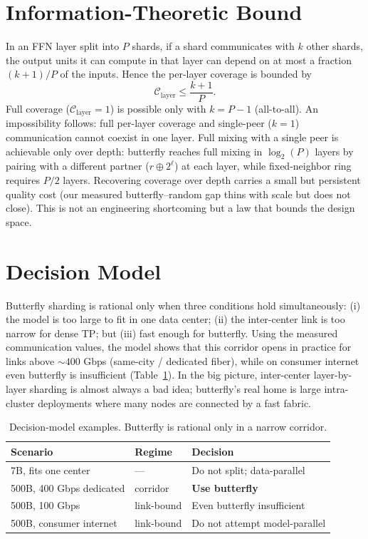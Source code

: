 \documentclass[10pt,journal]{IEEEtran}
\begin{document}
\section{Information-Theoretic Bound}
\label{sec:bound}
In an FFN layer split into $P$ shards, if a shard communicates with $k$ other shards, the output
units it can compute in that layer can depend on at most a fraction $(k{+}1)/P$ of the inputs.
Hence the per-layer coverage is bounded by
\begin{equation}
\mathcal{C}_{\text{layer}} \le \frac{k+1}{P} .
\end{equation}
Full coverage ($\mathcal{C}_{\text{layer}}{=}1$) is possible only with $k{=}P{-}1$ (all-to-all).
An impossibility follows: full per-layer coverage and single-peer ($k{=}1$) communication cannot
coexist in one layer. Full mixing with a single peer is achievable only over depth: butterfly
reaches full mixing in $\log_2(P)$ layers by pairing with a different partner ($r\oplus 2^\ell$)
at each layer, while fixed-neighbor ring requires $P/2$ layers. Recovering coverage over depth
carries a small but persistent quality cost (our measured butterfly--random gap thins with scale
but does not close). This is not an engineering shortcoming but a law that bounds the design space.

\section{Decision Model}
Butterfly sharding is rational only when three conditions hold simultaneously: (i) the model is
too large to fit in one data center; (ii) the inter-center link is too narrow for dense TP; but
(iii) fast enough for butterfly. Using the measured communication values, the model shows that
this corridor opens in practice for links above $\sim\!400$ Gbps (same-city / dedicated fiber),
while on consumer internet even butterfly is insufficient (Table~\ref{tab:decision}). In the big
picture, inter-center layer-by-layer sharding is almost always a bad idea; butterfly's real home
is large intra-cluster deployments where many nodes are connected by a fast fabric.

\begin{table}[!t]
\centering
\footnotesize
\caption{Decision-model examples. Butterfly is rational only in a narrow corridor.}
\label{tab:decision}
\begin{tabular}{@{}p{3.0cm}p{1.5cm}p{2.4cm}@{}}
\toprule
Scenario & Regime & Decision \\
\midrule
7B, fits one center       & ---           & Do not split; data-parallel \\
500B, 400 Gbps dedicated  & corridor      & \textbf{Use butterfly} \\
500B, 100 Gbps            & link-bound    & Even butterfly insufficient \\
500B, consumer internet   & link-bound    & Do not attempt model-parallel \\
\bottomrule
\end{tabular}
\end{table}
\end{document}
